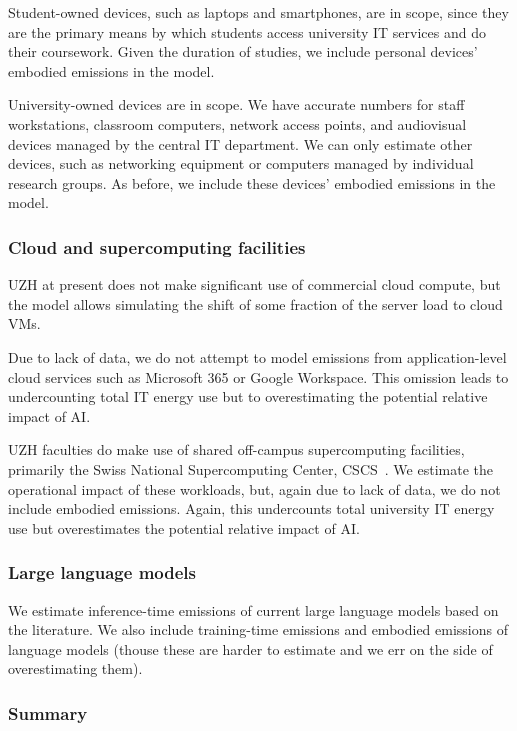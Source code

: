 \documentclass[11pt]{article}
\begin{document}
Student-owned devices, such as laptops and smartphones, are in scope, since they are the primary means by which students access university IT services and do their coursework. Given the duration of studies, we include personal devices' embodied emissions in the model.

University-owned devices are in scope. We have accurate numbers for staff workstations, classroom computers, network access points, and audiovisual devices managed by the central IT department. We can only estimate other devices, such as networking equipment or computers managed by individual research groups. As before, we include these devices' embodied emissions in the model.

\subsubsection*{Cloud and supercomputing facilities}

UZH at present does not make significant use of commercial cloud compute, but the model allows simulating the shift of some fraction of the server load to cloud VMs.

Due to lack of data, we do not attempt to model emissions from application-level cloud services such as Microsoft 365 or Google Workspace. This omission leads to undercounting total IT energy use but to overestimating the potential relative impact of AI.

UZH faculties do make use of shared off-campus supercomputing facilities, primarily the Swiss National Supercomputing Center, CSCS~\cite{cscs}. We estimate the operational impact of these workloads, but, again due to lack of data, we do not include embodied emissions. Again, this undercounts total university IT energy use but overestimates the potential relative impact of AI.

\subsubsection*{Large language models}

We estimate inference-time emissions of current large language models based on the literature. We also include training-time emissions and embodied emissions of language models (thouse these are harder to estimate and we err on the side of overestimating them).

\subsubsection*{Summary}
\end{document}
